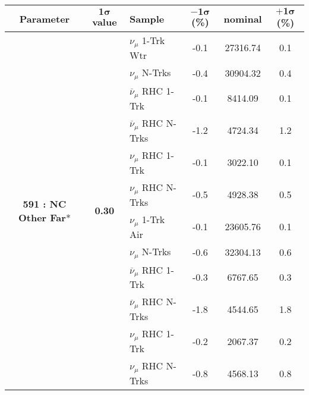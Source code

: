 \begin{table}[ht!]
\centering

\begin{tabular}{ c  c  l  c  c  c }
\midrule[1.3pt]
\textbf{Parameter} & \textbf{$\mathbf{1\sigma}$ value} & \textbf{Sample} & \textbf{$\mathbf{-1\sigma}$ (\%)}  &  \textbf{nominal}  &  \textbf{$\mathbf{+1\sigma}$ (\%)} \\
\midrule[1.3pt]
\multirow{12}{*}{\textbf{591 : NC Other Far}*} & \multirow{12}{*}{\textbf{0.30}} & $\nu_\mu$ 1-Trk Wtr &   -0.1 &  27316.74 &   0.1 \\ 
 &  & $\nu_\mu$ N-Trks &   -0.4 &  30904.32 &   0.4 \\ 
 &  & $\overline{\nu}_\mu$ RHC 1-Trk &   -0.1 &  8414.09 &   0.1 \\ 
 &  & $\overline{\nu}_\mu$ RHC N-Trks &   -1.2 &  4724.34 &   1.2 \\ 
 &  & $\nu_\mu$ RHC 1-Trk &   -0.1 &  3022.10 &   0.1 \\ 
 &  & $\nu_\mu$ RHC N-Trks &   -0.5 &  4928.38 &   0.5 \\ 
 &  & $\nu_\mu$ 1-Trk Air &   -0.1 &  23605.76 &   0.1 \\ 
 &  & $\nu_\mu$ N-Trks &   -0.6 &  32304.13 &   0.6 \\ 
 &  & $\overline{\nu}_\mu$ RHC 1-Trk &   -0.3 &  6767.65 &   0.3 \\ 
 &  & $\overline{\nu}_\mu$ RHC N-Trks &   -1.8 &  4544.65 &   1.8 \\ 
 &  & $\nu_\mu$ RHC 1-Trk &   -0.2 &  2067.37 &   0.2 \\ 
 &  & $\nu_\mu$ RHC N-Trks &   -0.8 &  4568.13 &   0.8 \\ 
\midrule[1.3pt]
\end{tabular}
\end{table}
\addtocounter{table}{-1}
